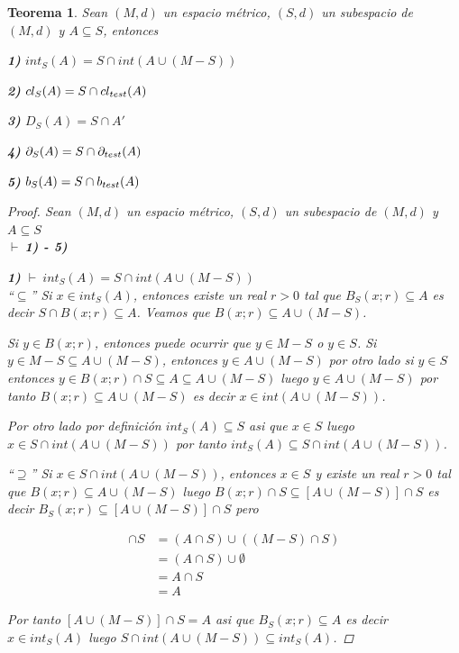 \documentclass[oneside]{book} %
\theoremstyle{Teorema}
\newtheorem{Teorema}[Definicion]{Teorema}
\theoremstyle{Ejemplos}
\theoremstyle{[Obs]}
\def \test {test}
\newcommand{\cerradura}[2][\test]{\ifx \test #1 {\overline{#2}} \else {cl_{#1}(#2)} \fi} %
\newcommand{\frontera}[2][\test]{\ifx \test #1 {\partial(#2)} \else {\partial_{#1}(#2)} \fi} %
\newcommand{\borde}[2][\test]{\ifx \test #1 {b(#2)} \else {b_{#1}(#2)} \fi} %
\renewcommand{\{}{\left\lbrace} %
\renewcommand{\}}{\right\rbrace} %
\renewcommand{\u}{\cup} %
\newcommand{\n}{\cap} %
\renewcommand{\sc}{\subseteq} %
\newcommand{\Sc}{\supseteq} %
\newcommand{\pd}{$\vdash\ $} %
\begin{document}
			\begin{Teorema}\setlength{\parindent}{0em}
			
				Sean $(M, d)$ un espacio métrico, $(S, d)$ un subespacio de $(M, d)$ y $A \sc S$, entonces 

				\textbf{1)} $int_{S}(A) = S \n int(A \u (M - S))$ 

				\textbf{2)} $\cerradura[S]{A} = S \n \cerradura{A}$

				\textbf{3)} $D_{S}(A) = S \n A'$

				\textbf{4)} $\frontera[S]{A} = S \n \frontera{A}$

				\textbf{5)} $\borde[S]{A} = S \n \borde{A}$
 			
				\begin{proof}
					
					Sean $(M, d)$ un espacio métrico, $(S, d)$ un subespacio de $(M, d)$ y $A \sc S$ \\ 
					\pd \textbf{1) - 5)}
					
					\textbf{1)} \pd $int_{S}(A) = S \n int(A \u (M - S))$ \\
					``$\sc$'' Si $x \in int_{S}(A)$, entonces existe un real $r > 0$ tal que $B_{S}(x;r) \sc A$ es decir $S \n B(x;r) \sc A$. Veamos que $B(x;r) \sc A \u (M - S)$.

					Si $y \in B(x;r)$, entonces puede ocurrir que $y \in M - S$ o $y \in S$. Si $y \in M - S \sc A \u (M - S)$, entonces $y \in A \u (M - S)$ por otro lado si $y \in S$ entonces $y \in B(x;r) \n S \sc A \sc A \u (M - S)$ luego $y \in A \u (M - S)$ por tanto $B(x;r) \sc A \u (M - S)$ es decir $x \in int(A \u (M - S))$.
					
					Por otro lado por definición $int_{S}(A) \sc S$ asi que $x \in S$ luego $x \in S \n int(A \u (M - S))$ por tanto $int_{S}(A) \sc S \n int(A \u (M - S))$.
 
					``$\Sc$'' Si $x \in S \n int(A \u (M - S))$, entonces $x \in S$ y existe un real $r > 0$ tal que $B(x;r) \sc A \u (M - S)$ luego $B(x;r) \n S \sc [A \u (M - S)] \n S$ es decir $B_{S}(x;r) \sc [A \u (M - S)] \n S$ pero 

					\begin{align*}
						[A \u (M - S)] \n S &= (A \n S) \u ((M - S) \n S) \\ 
						&= (A \n S) \u \emptyset \\ 
						&= A \n S \\ 
						&= A 
					\end{align*}

					Por tanto $[A \u (M - S)] \n S = A$ asi que $B_{S}(x;r) \sc A$ es decir $x \in int_{S}(A)$ luego $S \n int(A \u (M - S)) \sc int_{S}(A)$.


\end{proof}
\end{Teorema}
\end{document}
